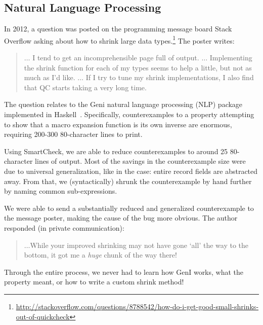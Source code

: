 \documentclass{sigplanconf}
\newcommand{\ttp}[1]{\texttt{#1}}
\begin{document}

\subsection{Natural Language Processing} \label{sec:nlp}
In 2012, a question was posted on the programming message board
Stack Overflow asking about how to shrink large data
types.\footnote{\url{http://stackoverflow.com/questions/8788542/how-do-i-get-good-small-shrinks-out-of-quickcheck}}
The poster writes:
\begin{quote}
$\ldots$ I tend to get an incomprehensible page full of output. $\ldots$
  Implementing the shrink function for each of my types seems to help a little,
  but not as much as I'd like.  $\ldots$ If I try to tune my shrink
  implementations, I also find that QC starts taking a very long time.
\end{quote}

\noindent
The question relates to the Geni natural language processing (NLP) package
implemented in Haskell~\cite{kow}.  Specifically, counterexamples to a property
attempting to show that a macro expansion function is its own inverse are
enormous, requiring 200-300 80-character lines to print.

Using SmartCheck, we are able to reduce counterexamples to around 25
80-character lines of output.  Most of the savings in the counterexample size
were due to universal generalization, like in the \xmonad case: entire record
fields are abstracted away.  From that, we (syntactically) shrunk the
counterexample by hand further by naming common sub-expressions.

We were able to send a substantially reduced and generalized counterexample to
the message poster, making the cause of the bug more obvious.  The author
responded (in private communication):
\begin{quote}
$\ldots$While your improved shrinking may not have gone `all'
the way to the bottom, it got me a \emph{huge} chunk of the way there!
\end{quote}

\noindent
Through the entire process, we never had to learn how GenI works, what the
property meant, or how to write a custom shrink method!
\end{document}
